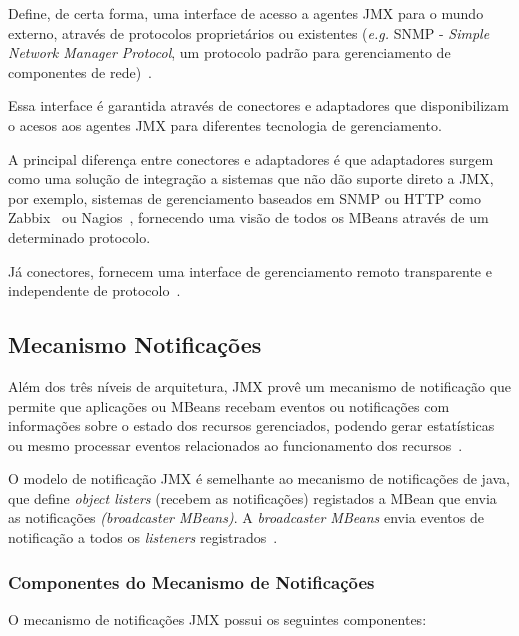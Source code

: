 Define, de certa forma, uma interface de acesso a agentes JMX para o mundo externo, através de protocolos proprietários ou existentes (\textit{e.g.} SNMP - \textit{Simple Network Manager Protocol}, um protocolo padrão para gerenciamento de componentes de rede)~\cite{douglas2005essential}.

Essa interface é garantida através de conectores e adaptadores que disponibilizam o acesos aos agentes JMX para diferentes tecnologia de gerenciamento.

A principal diferença entre conectores e adaptadores é que adaptadores surgem como uma solução de integração a sistemas que não dão suporte direto a JMX, por exemplo, sistemas de gerenciamento baseados em SNMP ou HTTP como Zabbix~\cite{zabbix} ou Nagios~\cite{nagios}, fornecendo uma visão de todos os MBeans através de um determinado protocolo. 

Já conectores, fornecem uma interface de gerenciamento remoto transparente e independente de protocolo~\cite{jmx}.


\subsection{Mecanismo Notificações}
Além dos três níveis de arquitetura, JMX provê um mecanismo de notificação que permite que aplicações ou MBeans recebam eventos ou notificações com informações sobre o estado dos recursos gerenciados, podendo gerar estatísticas ou mesmo processar eventos relacionados ao funcionamento dos recursos~\cite{lindfors2002jmx}.

O modelo de notificação JMX é semelhante ao mecanismo de notificações de java, que define \textit{object listers} (recebem as notificações) registados a MBean que envia as notificações \textit{(broadcaster MBeans)}. A \textit{broadcaster MBeans} envia eventos de notificação a todos os \textit{listeners} registrados~\cite{lindfors2002jmx}.

\subsubsection{Componentes do Mecanismo de Notificações}

O mecanismo de notificações JMX possui os seguintes componentes:

